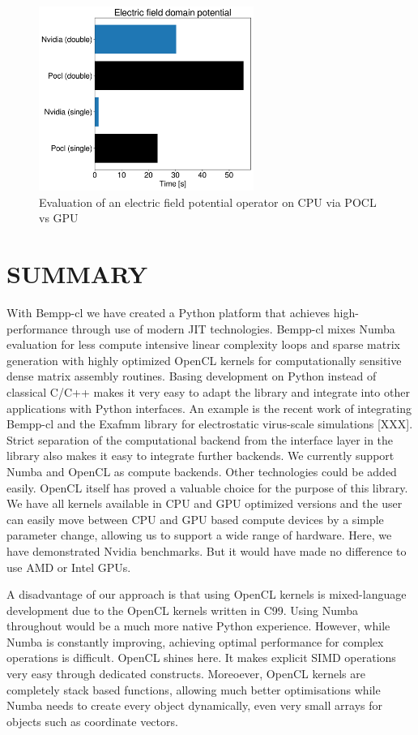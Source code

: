 \begin{figure}
	\center
	\includegraphics[width=7cm]{img/efield_domain_potential.pdf}
	\caption{Evaluation of an electric field potential operator on CPU via POCL vs GPU}
	\label{fig:efield_domain_potential}
\end{figure}

\section{SUMMARY}

With Bempp-cl we have created a Python platform that achieves high-performance through use of modern JIT technologies. Bempp-cl mixes Numba evaluation for less compute intensive linear complexity loops and sparse matrix generation with highly optimized OpenCL kernels for computationally sensitive dense matrix assembly routines. Basing development on Python instead of classical C/C++ makes it very easy to adapt the library and integrate into other applications with Python interfaces. An example is the recent work of integrating Bempp-cl and the Exafmm library for electrostatic virus-scale simulations [XXX]. Strict separation of the computational backend from the interface layer in the library also makes it easy to integrate further backends. We currently support Numba and OpenCL as compute backends. Other technologies could be added easily. OpenCL itself has proved a valuable choice for the purpose of this library. We have all kernels available in CPU and GPU optimized versions and the user can easily move between CPU and GPU based compute devices by a simple parameter change, allowing us to support a wide range of hardware. Here, we have demonstrated Nvidia benchmarks. But it would have made no difference to use AMD or Intel GPUs.

A disadvantage of our approach is that using OpenCL kernels is mixed-language development due to the OpenCL kernels written in C99. Using Numba throughout would be a much more native Python experience. However, while Numba is constantly improving, achieving optimal performance for complex operations is difficult. OpenCL shines here. It makes explicit SIMD operations very easy through dedicated constructs. Moreoever, OpenCL kernels are completely stack based functions, allowing much better optimisations while Numba needs to create every object dynamically, even very small arrays for objects such as coordinate vectors.

